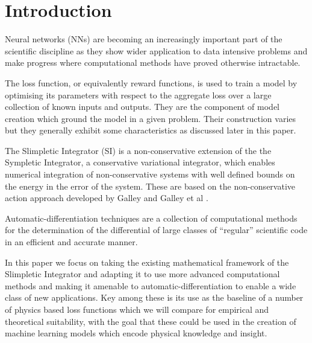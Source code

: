 \documentclass[10pt]{iopart}
\def\SI{Slimpletic Integrator }
\def\autodiff{automatic-differentiation }
\begin{document}

\section{Introduction}


Neural networks (NNs) are becoming an increasingly important part of the scientific discipline as they show wider application to data intensive problems and make progress where computational methods have proved otherwise intractable. %

The loss function, or equivalently reward functions, is used to train a model by optimising its parameters with respect to the aggregate loss over a large collection of known inputs and outputs. They are the component of model creation which ground the model in a given problem. Their construction varies but they generally exhibit some characteristics as discussed later in this paper. %

The \SI (SI)\cite{tsangSLIMPLECTICINTEGRATORSVARIATIONAL2015} is a non-conservative extension of the the Sympletic Integrator, a conservative variational integrator, which enables numerical integration of non-conservative systems with well defined bounds on the energy in the error of the system. These are based on the non-conservative action approach developed by Galley and Galley et al .

Automatic-differentiation  techniques are a collection of computational methods for the determination of the differential of large classes of \enquote{regular} scientific code in an efficient and accurate manner.


In this paper we focus on taking the existing mathematical framework of the \SI and adapting it to use more advanced computational methods and making it amenable to \autodiff to enable a wide class of new applications. Key among these is its use as the baseline of a number of physics based  loss functions which we will compare for empirical and theoretical suitability, with the goal that these could be used in the creation of machine learning models which encode physical knowledge and insight.
\end{document}
